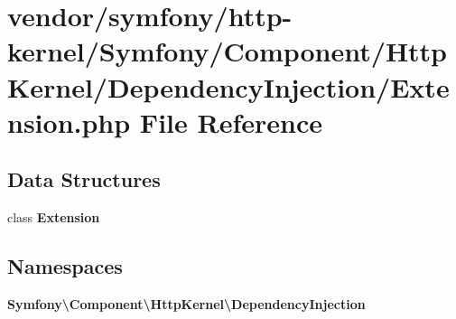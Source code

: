 \section{vendor/symfony/http-\/kernel/\+Symfony/\+Component/\+Http\+Kernel/\+Dependency\+Injection/\+Extension.php File Reference}
\label{_extension_8php}
\subsection*{Data Structures}
\begin{DoxyCompactItemize}
\item 
class {\bf Extension}
\end{DoxyCompactItemize}
\subsection*{Namespaces}
\begin{DoxyCompactItemize}
\item 
 {\bf Symfony\textbackslash{}\+Component\textbackslash{}\+Http\+Kernel\textbackslash{}\+Dependency\+Injection}
\end{DoxyCompactItemize}
